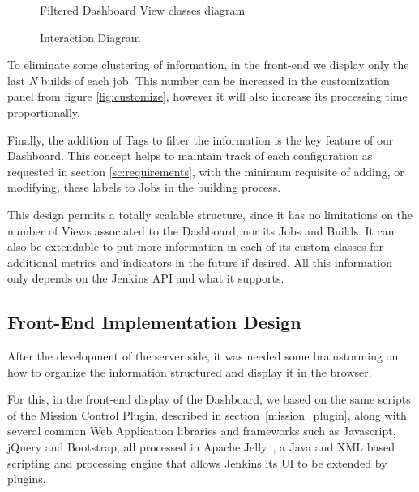       \begin{figure}[H]
  \centering
      \caption{Filtered Dashboard View classes diagram}
      \label{fig:dash_uml}
  \end{figure}

      \begin{figure}[H]
  \centering
      \caption{Interaction Diagram}
      \label{fig:pluginInteraction}
  \end{figure}

To eliminate some clustering of information, in the front-end we display only the last \textit{N} builds of each job. This number can be increased in the customization panel from figure \ref{fig:customize}, however it will also increase its processing time proportionally.

Finally, the addition of Tags to filter the information is the key feature of our Dashboard. This concept helps to maintain track of each configuration as requested in section \ref{sc:requirements}, with the minimum requisite of adding, or modifying, these labels to Jobs in the building process.

This design permits a totally scalable structure, since it has no limitations on the number of Views associated to the Dashboard, nor its Jobs and Builds. It can also be extendable to put more information in each of its custom classes for additional metrics and indicators in the future if desired. All this information only depends on the Jenkins API and what it supports.

\subsection{Front-End Implementation Design}\label{sc:frontend}

After the development of the server side, it was needed some brainstorming on how to organize the information structured and display it in the browser. 

For this, in the front-end display of the Dashboard, we based on the same scripts of the Mission Control Plugin, described in section~\ref{mission_plugin}, along with several common Web Application libraries and frameworks such as Javascript, jQuery and Bootstrap, all processed in Apache Jelly~\cite{jelly}, a Java and XML based scripting and processing engine that allows Jenkins its UI to be extended by plugins.

